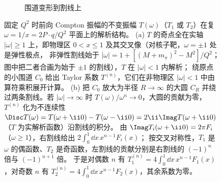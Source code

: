 \begin{figure}[htbp]
\begin{subfigure}[b]{0.48\textwidth}
\caption{围道变形到割线上}
\end{subfigure}
\caption{固定 $Q^2$ 时前向 Compton 振幅的不变振幅 $T(\omega)$（$T_1$ 或 $T_2$）在复 $\omega=1/x=2P\cdot q/Q^2$ 平面上的解析结构。
(a) $T$ 的奇点全在实轴 $|\omega|\ge1$ 上，即物理区 $0<x\le1$ 及其交叉像（对核子靶，$\omega=\pm1$ 处是弹性极点，
非弹性割线始于 $|\omega|=1+[(M+m_\pi)^2-M^2]/Q^2$；图中把二者合画为始于 $\pm1$ 的割线），$T$ 在 $|\omega|<1$ 内解析；
绕原点的小围道 $C_0$ 给出 Taylor 系数 $T^{(n)}$，它们在非物理区 $|\omega|<1$ 中由算符乘积展开计算。
(b) 把 $C_0$ 放大为半径 $R\to\infty$ 的大圆 $C_R$ 并绕过两条割线。若 $|\omega|\to\infty$ 时 $T(\omega)/\omega^{n}\to0$，大圆的贡献为零，
$T^{(n)}$ 化为不连续性 $\Disc T(\omega)=T(\omega+\ii0)-T(\omega-\ii0)=2\ii\Imag T(\omega+\ii0)$（$T$ 为实解析函数）沿割线的积分。
由 $\Imag T_i(\omega+\ii0)=2\pi F_i$（$\omega\ge1$），右割线给出 $2\int_0^1\dd x\,x^{n-1}F_i(x)$；
按交叉对称性，$T_1$ 是 $\omega$ 的偶函数、$T_2$ 是奇函数，左割线的贡献分别是右割线的 $(-1)^n$ 倍与 $(-1)^{n+1}$ 倍。
于是对偶数 $n$ 有 $T_1^{(n)}=4\int_0^1\dd x\,x^{n-1}F_1(x)$，对奇数 $n$ 有 $T_2^{(n)}=4\int_0^1\dd x\,x^{n-1}F_2(x)$，其余系数为零。}
\label{fig:omega-plane}
\end{figure}


